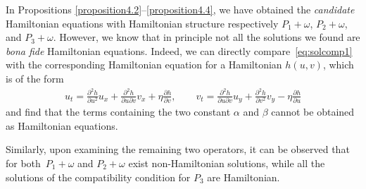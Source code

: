 \documentclass[10pt,a4paper]{amsart}
\numberwithin{equation}{section}
\begin{document}
In Propositions \ref{proposition4.2}--\ref{proposition4.4}, we have obtained the \emph{candidate} Hamiltonian equations with Hamiltonian structure respectively $P_1+\omega$, $P_2+\omega$, and $P_3+\omega$. However, we know that in principle not all the solutions we found are \emph{bona fide} Hamiltonian equations. Indeed, we can directly compare~\eqref{eq:solcomp1} with the corresponding Hamiltonian equation for a Hamiltonian $h(u,v)$, which is of the form
\begin{gather*}
u_t=\frac{\partial^2 h}{\partial u^2}u_x+\frac{\partial^2 h}{\partial u\partial v}v_x+\eta\frac{\partial h}{\partial v},\qquad
v_t=\frac{\partial^2 h}{\partial u\partial v}u_y+\frac{\partial^2 h}{\partial v^2}v_y-\eta\frac{\partial h}{\partial u}
\end{gather*}
and find that the terms containing the two constant $\alpha$ and $\beta$ cannot be obtained as Hamiltonian equations.

Similarly, upon examining the remaining two operators, it can be observed that for both~${P_1\!+\!\omega}$ and $P_2+\omega$ exist non-Hamiltonian solutions, while all the solutions of the compatibility condition for $P_3$ are Hamiltonian.
\end{document}
